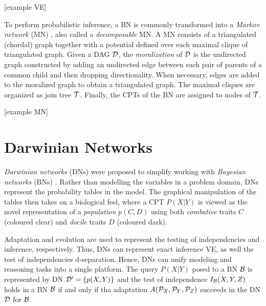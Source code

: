 
[example VE]

To perform probabilistic inference, a BN is commonly transformed into a \emph{Markov network} (MN) \cite{pear88}, also called a \emph{decomposable} MN. 
A MN consists of a triangulated (chordal) graph together with a potential defined over each maximal clique of triangulated graph. 
Given a DAG ${\cal D}$, the \emph{moralization} \cite{laur88} of ${\cal D}$ is the undirected graph constructed by adding an undirected edge between each pair of parents of a common child and then dropping directionality.
When necessary, edges are added to the moralized graph to obtain a triangulated graph. 
The maximal cliques are organized as join tree $\cal T$. 
Finally, the CPTs of the BN are assigned to nodes of $\cal T$. 

[example MN]

\clearpage

\section{Darwinian Networks}
\label{sec:darwinian_networks}

\emph{Darwinian networks} (DNs) \cite{butzOliveiraSantosCai15} were proposed to simplify working with \emph{Bayesian networks} (BNs) \cite{pear88}.
Rather than modelling the variables in a problem domain, DNs represent the probability tables in the model.
The graphical manipulation of the tables then takes on a biological feel, where a CPT $P(X|Y)$ is viewed as the novel representation of a \emph{population} $p(C,D)$ using both \emph{combative} traits $C$ (coloured clear) and \emph{docile} traits $D$ (coloured dark).




Adaptation and evolution are used to represent the testing of independencies and inference, respectively.
Thus, DNs can represent exact inference VE, as well the test of independencies d-separation.
Hence, DNs can unify modeling and reasoning tasks into a single platform.
The query $P(X|Y)$ posed to a BN ${\cal B}$ is represented by DN ${\cal D}^{\prime} = \{ p(X,Y) \}$ and the test of independence $I_{\cal{B}}(X,Y,Z)$ holds in a BN $\cal{B}$ if and only if tha adaptation $A({\cal{P}}_X, {\cal{P}}_Y, {\cal{P}}_Z)$ succeeds in the DN $\cal{D}$ for $\cal{B}$.



